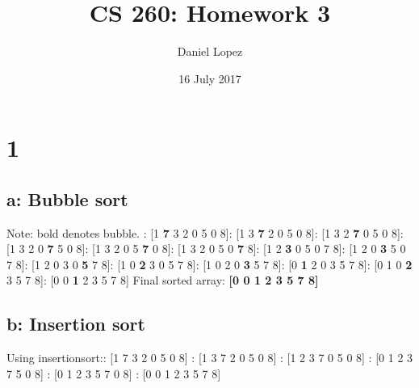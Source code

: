 \documentclass{article}
\begin{document}
\title{CS 260: Homework 3}
\author{Daniel Lopez}
\maketitle

\date{16 July 2017}

\section{1}
\subsection{a: Bubble sort}
Note: bold denotes bubble. : [1 \textbf{7} 3 2 0 5 0 8]: [1 3 \textbf{7} 2 0 5 0 8]: [1 3 2 \textbf{7} 0 5 0 8]: [1 3 2 0 \textbf{7} 5 0 8]: [1 3 2 0 5 \textbf{7} 0 8]: [1 3 2 0 5 0 \textbf{7} 8]: [1 2 \textbf{3} 0 5 0 7 8]: [1 2 0 \textbf{3} 5 0 7 8]: [1 2 0 3 0 \textbf{5} 7 8]: [1 0 \textbf{2} 3 0 5 7 8]: [1 0 2 0 \textbf{3} 5 7 8]: [0 \textbf{1} 2 0 3 5 7 8]: [0 1 0 \textbf{2} 3 5 7 8]: [0 0 \textbf{1} 2 3 5 7 8]\newline
Final sorted array:\newline
\textbf{[0 0 1 2 3 5 7 8]}

\subsection{b: Insertion sort}
Using insertionsort:: [1 7 3 2 0 5 0 8] : [1 3 7 2 0 5 0 8] : [1 2 3 7 0 5 0 8] : [0 1 2 3 7 5 0 8] : [0 1 2 3 5 7 0 8] : [0 0 1 2 3 5 7 8] \newline
\end{document}
